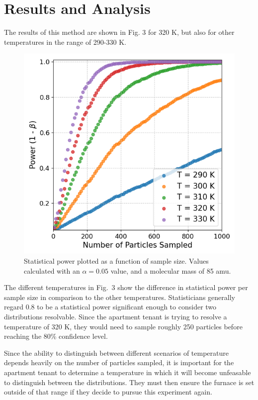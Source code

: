 \documentclass[%
 reprint,
 amsmath,amssymb,
 aps,
]{revtex4-2}
\begin{document}
\section{Results and Analysis}

The results of this method are shown in Fig. 3 for 320 K, but also for other temperatures in the range of 290-330 K.

\begin{figure}[h]
	\caption{Statistical power plotted as a function of sample size. Values calculated with an $\alpha = 0.05$ value, and a molecular mass of 85 amu.}
	\centering
	\includegraphics[scale=0.51]{results1.png}
\end{figure}

The different temperatures in Fig.\ 3 show the difference in statistical power per sample size in comparison to the other temperatures. Statisticians generally regard 0.8 to be a statistical power significant enough to consider two distributions resolvable. Since the apartment tenant is trying to resolve a temperature of 320 K, they would need to sample roughly 250 particles before reaching the 80\% confidence level.

Since the ability to distinguish between different scenarios of temperature depends heavily on the number of particles sampled, it is important for the apartment tenant to determine a temperature in which it will become unfeasable to distinguish between the distributions. They must then ensure the furnace is set outside of that range if they decide to pursue this experiment again. 
\end{document}
